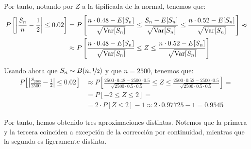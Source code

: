 \begin{ejercicio}
\begin{description}
        Por tanto, notando por $Z$ a la tipificada de la normal, tenemos que:
        \begin{align*}
            P\left[\left|\frac{S_{n}}{n} - \frac{1}{2}\right| \leq 0.02\right] &= 
            P\left[\frac{n\cdot 0.48 - E[S_{n}]}{\sqrt{\operatorname{Var}[S_{n}]}} \leq \frac{S_{n}-E[S_n]}{\sqrt{\operatorname{Var}[S_{n}]}} \leq \frac{n\cdot 0.52 - E[S_{n}]}{\sqrt{\operatorname{Var}[S_{n}]}}\right]
            \approx \\&\approx P\left[\frac{n\cdot 0.48 - E[S_{n}]}{\sqrt{\operatorname{Var}[S_{n}]}} \leq Z \leq \frac{n\cdot 0.52 - E[S_{n}]}{\sqrt{\operatorname{Var}[S_{n}]}}\right]
        \end{align*}

        Usando ahora que $S_{n} \sim B(n, \nicefrac{1}{2})$ y que $n=2500$, tenemos que:
        \begin{align*}
            P\left[\left|\frac{S_{2500}}{2500} - \frac{1}{2}\right| \leq 0.02\right] &\approx P\left[\frac{2500\cdot 0.48 - 2500\cdot 0.5}{\sqrt{2500 \cdot 0.5 \cdot 0.5}} \leq Z \leq \frac{2500\cdot 0.52 - 2500\cdot 0.5}{\sqrt{2500 \cdot 0.5 \cdot 0.5}}\right]
            =\\&= P\left[-2\leq Z \leq 2\right]
            =\\&= 2\cdot P\left[Z \leq 2\right]-1
            \approx 2\cdot 0.97725 - 1 = 0.9545
        \end{align*}
    \end{description}
    
    Por tanto, hemos obtenido tres aproximaciones distintas. Notemos que la primera y la tercera coinciden a excepción de la corrección por continuidad, mientras que la segunda es ligeramente distinta.

\end{ejercicio}

